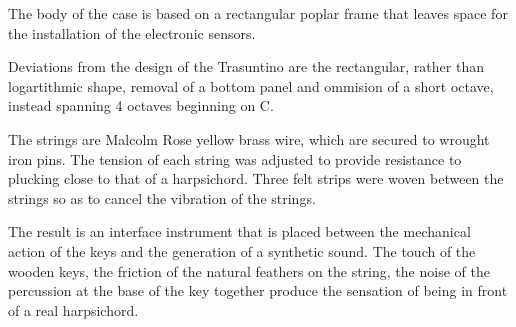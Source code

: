 The body of the case is based on a rectangular poplar frame that leaves space
for the installation of the electronic sensors.

Deviations from the design of the Trasuntino are the rectangular, rather than
logartithmic shape, removal of a bottom panel and ommision of a short octave,
instead spanning 4 octaves beginning on C.

The strings are Malcolm Rose yellow brass wire, which are secured to wrought
iron pins. The tension of each string was adjusted to provide resistance to
plucking close to that of a harpsichord. Three felt strips were woven between
the strings so as to cancel the vibration of the strings.

The result is an interface instrument that is placed between the mechanical
action of the keys and the generation of a synthetic sound. The touch of the
wooden keys, the friction of the natural feathers on the string, the noise of
the percussion at the base of the key together produce the sensation of being in
front of a real harpsichord.






